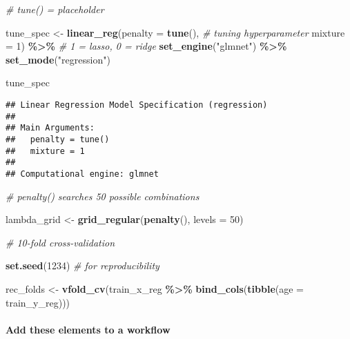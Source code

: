 \documentclass[
]{book}
\newenvironment{Shaded}{\begin{snugshade}}{\end{snugshade}}
\newcommand{\CommentTok}[1]{\textcolor[rgb]{0.56,0.35,0.01}{\textit{#1}}}
\newcommand{\DataTypeTok}[1]{\textcolor[rgb]{0.13,0.29,0.53}{#1}}
\newcommand{\DecValTok}[1]{\textcolor[rgb]{0.00,0.00,0.81}{#1}}
\newcommand{\KeywordTok}[1]{\textcolor[rgb]{0.13,0.29,0.53}{\textbf{#1}}}
\newcommand{\NormalTok}[1]{#1}
\newcommand{\OperatorTok}[1]{\textcolor[rgb]{0.81,0.36,0.00}{\textbf{#1}}}
\newcommand{\StringTok}[1]{\textcolor[rgb]{0.31,0.60,0.02}{#1}}
\begin{document}
\begin{Shaded}
\begin{Highlighting}[]
\CommentTok{\# tune() = placeholder }

\NormalTok{tune\_spec \textless{}{-}}\StringTok{ }\KeywordTok{linear\_reg}\NormalTok{(}\DataTypeTok{penalty =} \KeywordTok{tune}\NormalTok{(), }\CommentTok{\# tuning hyperparameter }
                        \DataTypeTok{mixture =} \DecValTok{1}\NormalTok{) }\OperatorTok{\%\textgreater{}\%}\StringTok{ }\CommentTok{\# 1 = lasso, 0 = ridge }
\StringTok{  }\KeywordTok{set\_engine}\NormalTok{(}\StringTok{"glmnet"}\NormalTok{) }\OperatorTok{\%\textgreater{}\%}
\StringTok{  }\KeywordTok{set\_mode}\NormalTok{(}\StringTok{"regression"}\NormalTok{) }

\NormalTok{tune\_spec}
\end{Highlighting}
\end{Shaded}

\begin{verbatim}
## Linear Regression Model Specification (regression)
## 
## Main Arguments:
##   penalty = tune()
##   mixture = 1
## 
## Computational engine: glmnet
\end{verbatim}

\begin{Shaded}
\begin{Highlighting}[]
\CommentTok{\# penalty() searches 50 possible combinations }

\NormalTok{lambda\_grid \textless{}{-}}\StringTok{ }\KeywordTok{grid\_regular}\NormalTok{(}\KeywordTok{penalty}\NormalTok{(), }\DataTypeTok{levels =} \DecValTok{50}\NormalTok{)}

\CommentTok{\# 10{-}fold cross{-}validation}

\KeywordTok{set.seed}\NormalTok{(}\DecValTok{1234}\NormalTok{) }\CommentTok{\# for reproducibility }

\NormalTok{rec\_folds \textless{}{-}}\StringTok{ }\KeywordTok{vfold\_cv}\NormalTok{(train\_x\_reg }\OperatorTok{\%\textgreater{}\%}\StringTok{ }\KeywordTok{bind\_cols}\NormalTok{(}\KeywordTok{tibble}\NormalTok{(}\DataTypeTok{age =}\NormalTok{ train\_y\_reg)))}
\end{Highlighting}
\end{Shaded}

\hypertarget{add-these-elements-to-a-workflow}{%
\paragraph{Add these elements to a workflow}\label{add-these-elements-to-a-workflow}}
\end{document}

